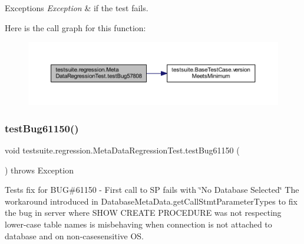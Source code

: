 \begin{DoxyExceptions}{Exceptions}
{\em Exception} & if the test fails. \\
\hline
\end{DoxyExceptions}
Here is the call graph for this function\+:
\nopagebreak
\begin{figure}[H]
\begin{center}
\leavevmode
\includegraphics[width=350pt]{classtestsuite_1_1regression_1_1_meta_data_regression_test_ade987f06121aa11b35ee8860ae893a51_cgraph}
\end{center}
\end{figure}
\mbox{\label{classtestsuite_1_1regression_1_1_meta_data_regression_test_ab171769c1d241e02730a4b626b9bd150}} 
\subsubsection{\texorpdfstring{test\+Bug61150()}{testBug61150()}}
{\footnotesize\ttfamily void testsuite.\+regression.\+Meta\+Data\+Regression\+Test.\+test\+Bug61150 (\begin{DoxyParamCaption}{ }\end{DoxyParamCaption}) throws Exception}

Tests fix for B\+UG\#61150 -\/ First call to SP fails with \char`\"{}\+No Database Selected\char`\"{} The workaround introduced in Database\+Meta\+Data.\+get\+Call\+Stmt\+Parameter\+Types to fix the bug in server where S\+H\+OW C\+R\+E\+A\+TE P\+R\+O\+C\+E\+D\+U\+RE was not respecting lower-\/case table names is misbehaving when connection is not attached to database and on non-\/casesensitive OS.


